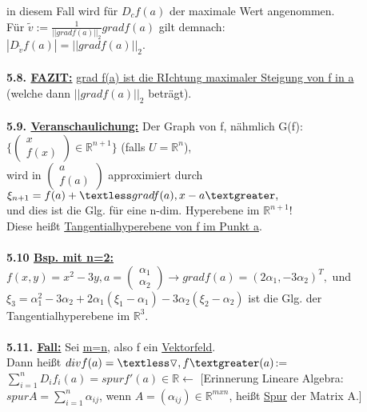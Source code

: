 \documentclass[]{scrartcl}
\begin{document}
	in diesem Fall wird für $D_cf(a)$ der maximale Wert angenommen.\\
	Für $\tilde{v}:=\frac{1}{||grad f(a)||_2} grad f(a)$ gilt demnach:\\
	$|D_{\tilde{v}}f(a)|=||grad f(a)||_2.$\\
	\\
	\textbf{5.8. \underline{FAZIT:}} \ul{grad f(a) ist die RIchtung maximaler Steigung von f in a}\\
	(welche dann $||grad f(a)||_2$ beträgt).\\
	\\
	\textbf{5.9. \underline{Veranschaulichung:}} Der Graph von f, nähmlich G(f):$\{\begin{pmatrix}
		x\\f(x)
	\end{pmatrix}\in\mathbb{R}^{n+1}\}$ (falls $U=\mathbb{R}^n$),\\
	wird in $\begin{pmatrix}
		a\\f(a)
	\end{pmatrix}$ approximiert durch\\
	$\xi_{n+1}= f(a)+\textless grad f(a), x-a\textgreater,$\\
	und dies ist die Glg. für eine n-dim. Hyperebene im $\mathbb{R}^{n+1}$!\\
	Diese heißt \ul{Tangentialhyperebene von f im Punkt a}.\\
	\\
	\textbf{5.10 \underline{Bsp. mit n=2:}} $f(x,y)=x^2-3y, a=\begin{pmatrix}
		\alpha_1\\\alpha_2
	\end{pmatrix}	\rightarrow grad f(a)=(2\alpha_1,-3\alpha_2)^T,$ und\\
	$\xi_3=\alpha_1^2-3\alpha_2+2\alpha_1(\xi_1-\alpha_1)-3\alpha_2(\xi_2-\alpha_2)$ ist die Glg. der Tangentialhyperebene im $\mathbb{R}^3.$\\
	\\
	\textbf{5.11. \underline{Fall:}} Sei \underline{\underline{m=n}}, also f ein \underline{Vektorfeld}.\\
	Dann heißt \ul{$div f(a)=\textless \triangledown, f\textgreater(a)$}:=$\sum_{i=1}^{n}D_if_i(a)=spur f'(a)\in\mathbb{R}\leftarrow$ [Erinnerung Lineare Algebra: $spur A = \sum_{i=1}^{n}\alpha_{ij}$, wenn $A=(\alpha_{ij})\in \mathbb{R}^{m x n}$, heißt \ul{Spur} der Matrix A.]\\
\end{document}
